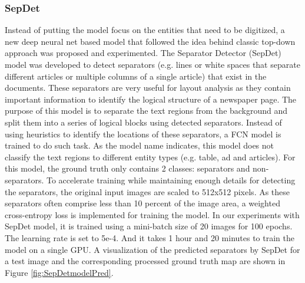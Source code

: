 \documentclass[letterpaper]{article} %
\begin{document}
\subsubsection{SepDet}
Instead of putting the model focus on the entities that need to be digitized, a new deep neural net based model that followed the idea behind classic top-down approach  was proposed and experimented. The Separator Detector (SepDet) model was developed to detect separators (e.g. lines or white spaces that separate different articles or multiple columns of a single article) that exist in the documents. These separators are very useful for layout analysis as they contain important information to identify the logical structure of a newspaper page. The purpose of this model is to separate the text regions from the background and split them into a series of logical blocks using detected separators. Instead of using heuristics to identify the locations of these separators, a FCN model is trained to do such task.  As the model name indicates, this model does not classify the text regions to different entity types (e.g. table, ad and articles). For this model, the ground truth only contains 2 classes: separators and non-separators. To accelerate training while maintaining enough details for detecting the separators, the original input images are scaled to 512x512 pixels. As these separators often comprise less than 10 percent of the image area, a weighted cross-entropy loss is implemented for training the model. 
In our experiments with SepDet model, it is trained using a mini-batch size of 20 images for 100 epochs. The learning rate is set to 5e-4. And it takes 1 hour and 20 minutes to train the model on a single GPU.
A visualization of the predicted separators by SepDet for a test image and the corresponding processed ground truth map are shown in Figure \ref{fig:SepDetmodelPred}.
\end{document}
